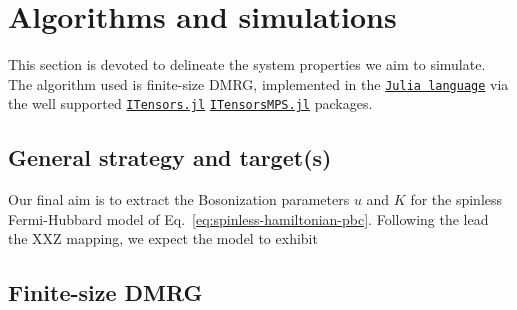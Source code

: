 \clearpage
\section{Algorithms and simulations}

This section is devoted to delineate the system properties we aim to simulate. The algorithm used is finite-size DMRG, implemented in the \href{https://docs.julialang.org/en/}{\texttt{Julia language}} via the well supported \href{https://itensor.github.io/ITensors.jl/stable/index.html}{\texttt{ITensors.jl}} \href{https://itensor.github.io/ITensorMPS.jl/stable/}{\texttt{ITensorsMPS.jl}} packages.

\subsection{General strategy and target(s)}

Our final aim is to extract the Bosonization parameters $u$ and $K$ for the spinless Fermi-Hubbard model of Eq.~\eqref{eq:spinless-hamiltonian-pbc}. Following the lead the $\mathrm{XXZ}$ mapping, we expect the model to exhibit 

\subsection{Finite-size DMRG}

\todo